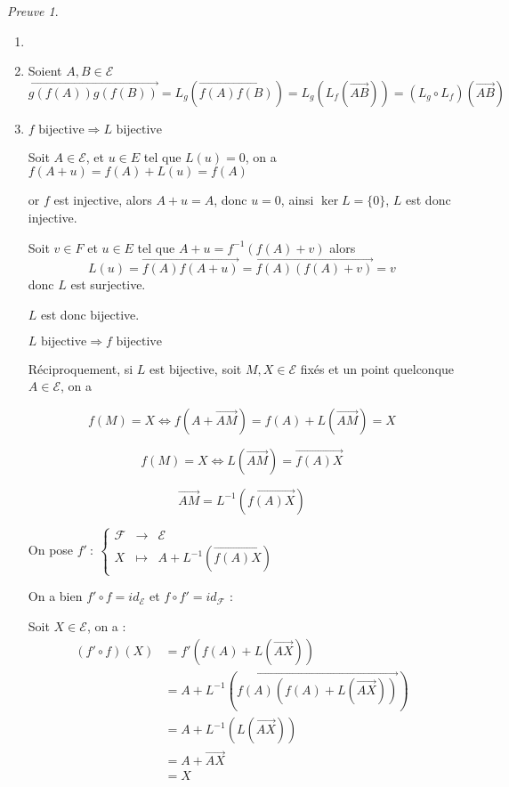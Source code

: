 \documentclass[]{article}
\theoremstyle{remark}
\newtheorem{myproof}{Preuve}
\theoremstyle{definition}
\newcommand{\func}[5]{
#1 ~ : ~ \left\{ \begin{array}{lcl}
	#2 & \longrightarrow & #3 \\
	#4 & \longmapsto & #5
\end{array}
\right.
}
\newenvironment{proofpart}[1]{
	\noindent
	{\textbf{\boldmath #1}}
}{
	\checkmark
}
\begin{document}
\begin{myproof}
	\leavevmode
	
	\begin{enumerate}
		\item \checkmark
		\item Soient $A, B \in \mathcal{E}$ $$\overrightarrow{g(f(A)) g(f(B))} = L_g(\overrightarrow{f(A) f(B)}) = L_g(L_f(\overrightarrow{AB})) = (L_g \circ L_f)(\overrightarrow{AB})$$
		\item
		\begin{proofpart}{$f \text{ bijective} \Longrightarrow L \text{ bijective}$}
		
			Soit $A \in \mathcal{E}$, et $u \in E$ tel que $L(u)=0$, on a $f(A + u) = f(A) + L(u) = f(A)$
			
			or $f$ est injective, alors $A+u = A$, donc $u = 0$, ainsi $\ker L = \{0\}$, $L$ est donc injective.
			
			Soit $v \in F$ et $u \in E$ tel que $A + u = f^{-1}(f(A) + v)$ alors $$L(u) = \overrightarrow{f(A)f(A+u)} =  \overrightarrow{f(A)(f(A)+v)} = v$$ donc $L$ est surjective.
			
			$L$ est donc bijective.

		\end{proofpart}

		\begin{proofpart}{$L \text{ bijective} \Longrightarrow f \text{ bijective}$}
			
			Réciproquement, si $L$ est bijective, soit $M,X \in \mathcal{E}$ fixés et un point quelconque $A \in \mathcal{E}$, on a
			
			$$f(M) = X \Longleftrightarrow f(A + \overrightarrow{AM}) = f(A) + L(\overrightarrow{AM}) = X$$
			
			$$f(M) = X \Longleftrightarrow L(\overrightarrow{AM}) = \overrightarrow{f(A)X}$$
			
			$$\overrightarrow{AM} = L^{-1}(\overrightarrow{f(A)X})$$
			
			On pose $\func{f'}{\mathcal{F}}{\mathcal{E}}{X}{A + L^{-1}(\overrightarrow{f(A)X})}$
	
			On a bien $f'\circ f = id_{\mathcal{E}}$ et $f \circ f' = id_{\mathcal{F}}$ :
			
			Soit $X \in \mathcal{E}$, on a :
			$$
			\begin{aligned}
				(f' \circ f)(X) &= f'\left(f(A)+L\left(\overrightarrow{AX}\right)\right)\\
				&=A+L^{-1}\left(\overrightarrow{f(A)\left(f(A)+L\left(\overrightarrow{AX}\right)\right)}\right)\\
				&=A+L^{-1}\left(L\left(\overrightarrow{AX}\right)\right)\\
				&=A+\overrightarrow{AX}\\
				&=X
			\end{aligned}$$
			

\end{proofpart}
\end{enumerate}
\end{myproof}
\end{document}
